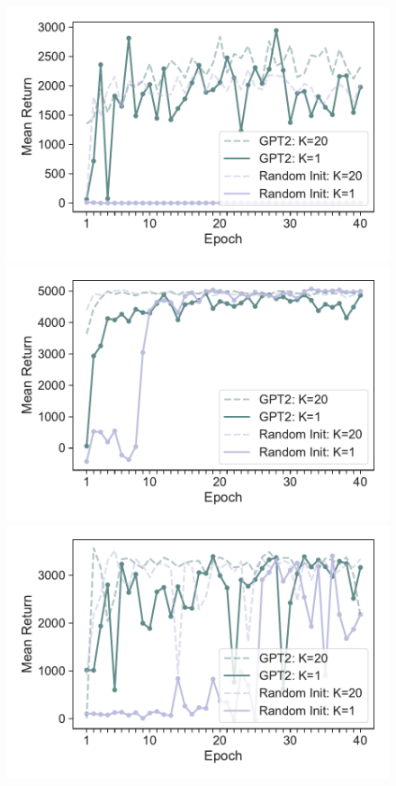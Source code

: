 \begin{figure}[h]
    \centering
    \begin{minipage}[b]{0.32\linewidth}
        \includegraphics[width=\linewidth]{figs/returnmean_gpt2_dt_K1_hopper_medium_666.pdf}
    \end{minipage}
    \begin{minipage}[b]{0.32\linewidth}
        \includegraphics[width=\linewidth]{figs/returnmean_gpt2_dt_K1_halfcheetah_medium_666.pdf}
    \end{minipage}
    \begin{minipage}[b]{0.32\linewidth}
        \includegraphics[width=\linewidth]{figs/returnmean_gpt2_dt_K1_walker2d_medium_666.pdf}

\end{minipage}
\end{figure}
